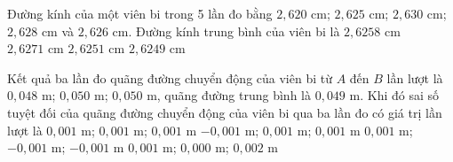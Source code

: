 \begin{vd}
Đường kính của một viên bi trong 5 lần đo bằng $2{,}620\text{ cm}$; $2{,}625\text{ cm}$; $2{,}630\text{ cm}$; $2{,}628\text{ cm}$ và $2{,}626\text{ cm}$. Đường kính trung bình của viên bi là
\choice
{\True $2{,}6258\text{ cm}$}
{$2{,}6271\text{ cm}$}
{$2{,}6251\text{ cm}$}
{$2{,}6249\text{ cm}$}
\end{vd}

\begin{vd}
Kết quả ba lần đo quãng đường chuyển động của viên bi từ $A$ đến $B$ lần lượt là $0{,}048\text{ m}$; $0{,}050\text{ m}$; $0{,}050\text{ m}$, quãng đường trung bình là $0{,}049\text{ m}$. Khi đó sai số tuyệt đối của quãng đường chuyển động của viên bi qua ba lần đo có giá trị lần lượt là
\choice
{\True $0{,}001\text{ m}$; $0{,}001\text{ m}$; $0{,}001\text{ m}$}
{$-0{,}001\text{ m}$; $0{,}001\text{ m}$; $0{,}001\text{ m}$}
{$0{,}001\text{ m}$; $-0{,}001\text{ m}$; $-0{,}001\text{ m}$}
{$0{,}001\text{ m}$; $0{,}000\text{ m}$; $0{,}002\text{ m}$}
\end{vd}

